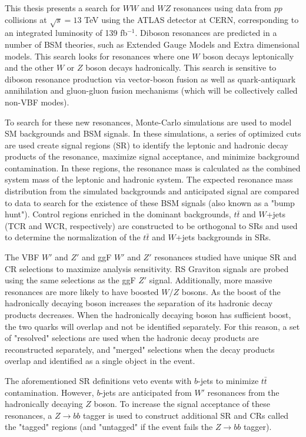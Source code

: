 This thesis presents a search for $WW$ and $WZ$ resonances using data from $pp$ collisions at $\sqrt{s}=13$ TeV using the ATLAS detector at CERN, corresponding to an integrated luminosity of 139 fb$^{-1}$. Diboson resonances are predicted in a number of BSM theories, such as Extended Gauge Models and Extra dimensional models. This search looks for resonances where one $W$ boson decays leptonically and the other $W$ or $Z$ boson decays hadronically. This search is sensitive to diboson resonance production via vector-boson fusion as well as quark-antiquark annihilation and gluon-gluon fusion mechanisms (which will be collectively called non-VBF modes).

To search for these new resonances, Monte-Carlo simulations are used to model SM backgrounds and BSM signals. In these simulations, a series of optimized cuts are used create signal regions (SR) to identify the leptonic and hadronic decay products of the resonance, maximize signal acceptance, and minimize background contamination. In these regions, the resonance mass is calculated as the combined system mass of the leptonic and hadronic system. The expected resonance mass distribution from the simulated backgrounds and anticipated signal are compared to data to search for the existence of these BSM signals (also known as a "bump hunt"). Control regions enriched in the dominant backgrounds, $t\bar{t}$ and $W$+jets (TCR and WCR, respectively) are constructed to be orthogonal to SRs and used to determine the normalization of the $t\bar{t}$ and $W$+jets backgrounds in SRs.

The VBF $W'$ and $Z'$ and ggF $W'$ and $Z'$ resonances studied have unique SR and CR selections to maximize analysis sensitivity. RS Graviton signals are probed using the same selections as the ggF $Z'$ signal. Additionally, more massive resonances are more likely to have boosted $W/Z$ bosons. As the boost of the hadronically decaying boson increases the separation of its hadronic decay products decreases. When the hadronically decaying boson has sufficient boost, the two quarks will overlap and not be identified separately. For this reason, a set of "resolved" selections are used when the hadronic decay products are reconstructed separately, and "merged" selections when the decay products overlap and identified as a single object in the event.

The aforementioned SR definitions veto events with $b$-jets to minimize $t\bar{t}$ contamination. However, $b$-jets are anticipated from $W'$ resonances from the hadronically decaying $Z$ boson. To increase the signal acceptance of these resonances, a $Z\rightarrow bb$ tagger is used to construct additional SR and CRs called the "tagged" regions (and "untagged" if the event fails the $Z\rightarrow bb$ tagger). 

